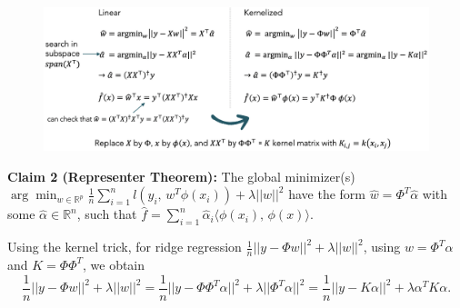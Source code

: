 \documentclass[a4paper]{extarticle}
\begin{document}
\begin{figure}[H]
    \includegraphics[width=15cm]{../images/IntroML_Fig5-1}
    \centering
\end{figure}

\begin{tbox}
    \textbf{Claim 2 (Representer Theorem):} The global minimizer(s) $\arg \min_{w \in \mathbb{R}^p} \frac{1}{n} \sum_{i = 1}^n l(y_i, \, w^T\phi(x_i)) + \lambda ||w||^2$ have the form $\hat{w} = \Phi^T\hat{\alpha}$ with some $\hat{\alpha} \in \mathbb{R}^n$, such that $\hat{f} = \sum_{i = 1}^n \hat{\alpha}_i \langle \phi(x_i), \, \phi(x) \rangle$.
\end{tbox}

Using the kernel trick, for ridge regression $\frac{1}{n}||y - \Phi w||^2 + \lambda ||w||^2$, using $w = \Phi^T\alpha$ and $K = \Phi \Phi^T$, we obtain
\[
    \frac{1}{n}||y - \Phi w||^2 + \lambda||w||^2 = \frac{1}{n}||y - \Phi \Phi^T \alpha ||^2 + \lambda || \Phi^T \alpha ||^2 = \frac{1}{n}||y - K \alpha ||^2 + \lambda \alpha^T K \alpha.
\]
\end{document}
